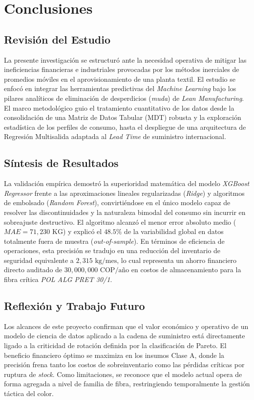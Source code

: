 \documentclass[conference,twoside]{IEEEtran}
\begin{document}



\section{Conclusiones}
\label{sec:conclusiones}

\subsection{Revisión del Estudio}
La presente investigación se estructuró ante la necesidad operativa de mitigar las ineficiencias financieras e industriales provocadas por los métodos inerciales de promedios móviles en el aprovisionamiento de una planta textil. El estudio se enfocó en integrar las herramientas predictivas del \textit{Machine Learning} bajo los pilares analíticos de eliminación de desperdicios (\textit{muda}) de \textit{Lean Manufacturing}. El marco metodológico guio el tratamiento cuantitativo de los datos desde la consolidación de una Matriz de Datos Tabular (MDT) robusta y la exploración estadística de los perfiles de consumo, hasta el despliegue de una arquitectura de Regresión Multisalida adaptada al \textit{Lead Time} de suministro internacional.

\subsection{Síntesis de Resultados}
La validación empírica demostró la superioridad matemática del modelo \textit{XGBoost Regressor} frente a las aproximaciones lineales regularizadas (\textit{Ridge}) y algoritmos de embolsado (\textit{Random Forest}), convirtiéndose en el único modelo capaz de resolver las discontinuidades y la naturaleza bimodal del consumo sin incurrir en sobreajuste destructivo. El algoritmo alcanzó el menor error absoluto medio ($MAE = 71,230\text{ KG}$) y explicó el $48.5\%$ de la variabilidad global en datos totalmente fuera de muestra (\textit{out-of-sample}). En términos de eficiencia de operaciones, esta precisión se tradujo en una reducción del inventario de seguridad equivalente a $2,315\text{ kg/mes}$, lo cual representa un ahorro financiero directo auditado de $30,000,000\text{ COP/año}$ en costos de almacenamiento para la fibra crítica \textit{POL ALG PRET 30/1}.

\subsection{Reflexión y Trabajo Futuro}
Los alcances de este proyecto confirman que el valor económico y operativo de un modelo de ciencia de datos aplicado a la cadena de suministro está directamente ligado a la criticidad de rotación definida por la clasificación de Pareto. El beneficio financiero óptimo se maximiza en los insumos Clase A, donde la precisión frena tanto los costos de sobreinventario como las pérdidas críticas por ruptura de \textit{stock}. Como limitaciones, se reconoce que el modelo actual opera de forma agregada a nivel de familia de fibra, restringiendo temporalmente la gestión táctica del color. 
\end{document}
